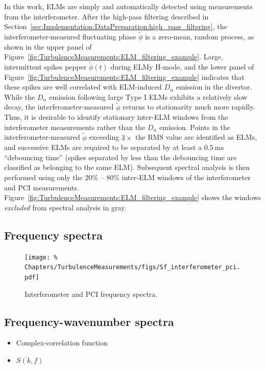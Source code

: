 In this work, ELMs are simply and automatically detected
using measurements from the interferometer.
After the high-pass filtering described in
Section~\ref{sec:Implementation:DataPreparation:high_pass_filtering},
the interferometer-measured fluctuating phase $\tilde{\phi}$
is a zero-mean, random process,
as shown in the upper panel of
Figure~\ref{fig:TurbulenceMeasurements:ELM_filtering_example}.
Large, intermittent spikes pepper $\tilde{\phi}(t)$ during ELMy H-mode, and
the lower panel of
Figure~\ref{fig:TurbulenceMeasurements:ELM_filtering_example}
indicates that these spikes are well correlated
with ELM-induced $D_{\alpha}$ emission in the divertor.
While the $D_{\alpha}$ emission following large Type I ELMs
exhibits a relatively slow decay,
the interferometer-measured $\tilde{\phi}$
returns to stationarity much more rapidly.
Thus, it is desirable to identify
stationary inter-ELM windows
from the interferometer measurements
rather than the $D_{\alpha}$ emission.
Points in the interferometer-measured $\tilde{\phi}$
exceeding $3 \times$ the RMS value
are identified as ELMs, and
successive ELMs are required to be separated
by at least a $\SI{0.5}{\milli\second}$ ``debouncing time''
(spikes separated by less than the debouncing time
are classified as belonging to the same ELM).
Subsequent spectral analysis is then performed
using only the $20\%$ -- $80\%$ inter-ELM windows
of the interferometer and PCI measurements.
Figure~\ref{fig:TurbulenceMeasurements:ELM_filtering_example}
shows the windows \emph{excluded} from spectral analysis in gray.


\subsection{Frequency spectra}
\begin{figure}
  \centering
  \texttt{[image: \%
    Chapters/TurbulenceMeasurements/figs/Sf\_interferometer\_pci.pdf]}
  \caption[Interferometer and PCI frequency spectra]{%
    Interferometer and PCI frequency spectra.
  }
\label{fig:TurbulenceMeasurements:Sf_interferometer_pci}
\end{figure}


\subsection{Frequency-wavenumber spectra}
\begin{itemize}
  \item Complex-correlation function
  \item $S(k,f)$
\end{itemize}

